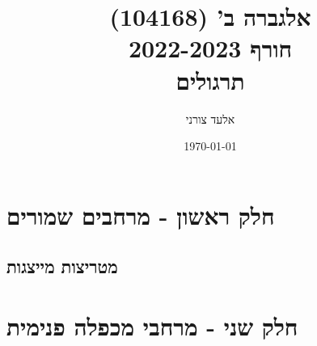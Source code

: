 \documentclass[a4paper,10pt,oneside,openany]{book}
\title{
אלגברה ב' (104168)
\\
חורף 2022-2023
\\
תרגולים
}
\author{אלעד צורני}
\date{\today}
\begin{document}
\maketitle

\part{חלק ראשון - מרחבים שמורים}

\chapter{מטריצות מייצגות}



\part{חלק שני - מרחבי מכפלה פנימית}

\pagebreak

\printbibliography
\end{document}

